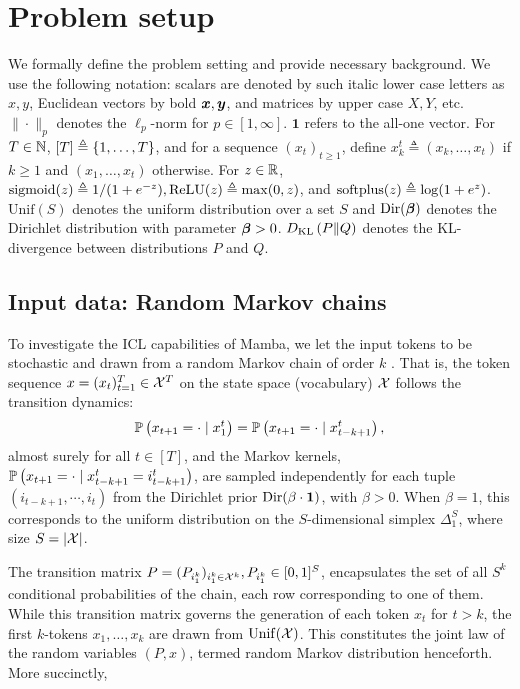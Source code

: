 
\section{Problem setup}
\label{sec:background}
We formally define the problem setting and provide necessary background. We use the following notation: scalars are denoted by such italic lower case letters as $x,y$, Euclidean vectors by bold $\boldsymbol{x}, \boldsymbol{y}$, and matrices by upper case $X, Y$, etc. $\| \cdot \|_p $ denotes the $\ell_p$-norm for $p \in [1, \infty]$. $\bm{1}$ refers to the all-one vector. For $T \in \mathbb{N}$, $[T] \triangleq \{1, \ldots, T \}$, and for a sequence $(x_t)_{t \geq 1}$, define $x_k^t \triangleq (x_k, \ldots, x_t)$ if $k \geq 1$ and $(x_1, \ldots, x_t)$ otherwise. For $z \in \mathbb{R}$,  $\mathrm{sigmoid}(z) \triangleq 1/(1+e^{-z}), \mathrm{ReLU}(z) \triangleq \max(0,z)$, and $\mathrm{softplus}(z) \triangleq \log(1+e^z)$. $\mathrm{Unif} (S)$ denotes the uniform distribution over a set $S$ and $\mathrm{Dir}(\boldsymbol{\beta})$ denotes the Dirichlet distribution with parameter $\boldsymbol{\beta} >0  $. $D_{\rm KL}\left(P \| Q\right)$ denotes the KL-divergence between distributions $P$ and $Q$. 
\subsection{Input data: Random Markov chains}
\label{sec:markov_background}
To investigate the ICL capabilities of Mamba, we let the input tokens to be stochastic and drawn from a random Markov chain of order $k$ \cite{edelman2024evolution}. That is, the token sequence $x = (x_t)_{t=1}^T \in \mathcal{X}^T$ on the state space (vocabulary) $\mathcal{X}$ follows the transition dynamics: 
\begin{align}
\mathbb{P}\left(x_{t+1} = \cdot \mid x_1^{t}\right) = \mathbb{P}\left(x_{t+1} = \cdot \mid x_{t-k+1}^{t}\right), 
\end{align}
almost surely for all $t \in [T]$, and the \kth Markov kernels, $ \mathbb{P}\left(x_{t+1} = \cdot \mid x_{t-k+1}^{t}=i_{t-k+1}^{t}\right)$, are sampled independently for each tuple $(i_{t-k+1},\cdots,i_t)$ from the Dirichlet prior $\mathrm{Dir}(\beta \cdot \bm{1})$, with $\beta >0$. When $\beta=1$, this corresponds to the uniform distribution on the $S$-dimensional simplex $\Delta_1^S$, where size $S=|\mathcal{X}|$. 

The transition matrix $P =(P_{i_1^k})_{i_1^k \in \mathcal{X}^k}, P_{i_1^k} \in [0,1]^S$, encapsulates the set of all $S^k$ conditional probabilities of the chain, each row corresponding to one of them. While this transition matrix governs the generation of each token $x_t$ for $t >k$, the first $k$-tokens $x_1,\ldots,x_k$ are drawn \iid from $\mathrm{Unif}(\mathcal{X})$. This constitutes the joint law of the random variables $(P,x)$, termed random Markov distribution henceforth. More succinctly, 


